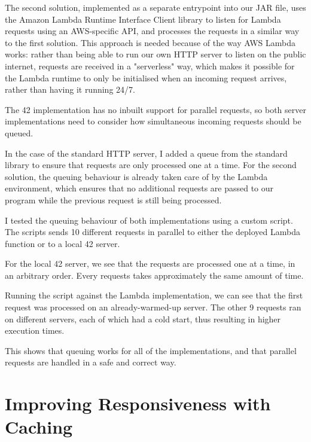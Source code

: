 The second solution, implemented as a separate entrypoint into our JAR file, uses the Amazon Lambda Runtime Interface Client library to listen for Lambda requests using an AWS-specific API, and processes the requests in a similar way to the first solution. This approach is needed because of the way AWS Lambda works: rather than being able to run our own HTTP server to listen on the public internet, requests are received in a "serverless" way, which makes it possible for the Lambda runtime to only be initialised when an incoming request arrives, rather than having it running 24/7.

The 42 implementation has no inbuilt support for parallel requests, so both server implementations need to consider how simultaneous incoming requests should be queued.

In the case of the standard HTTP server, I added a queue from the standard library to ensure that requests are only processed one at a time. For the second solution, the queuing behaviour is already taken care of by the Lambda environment, which ensures that no additional requests are passed to our program while the previous request is still being processed.

I tested the queuing behaviour of both implementations using a custom script. The scripts sends 10 different requests in parallel to either the deployed Lambda function or to a local 42 server.

For the local 42 server, we see that the requests are processed one at a time, in an arbitrary order. Every requests takes approximately the same amount of time.


Running the script against the Lambda implementation, we can see that the first request was processed on an already-warmed-up server. The other 9 requests ran on different servers, each of which had a cold start, thus resulting in higher execution times.


This shows that queuing works for all of the implementations, and that parallel requests are handled in a safe and correct way.

\chapter{Improving Responsiveness with Caching}

